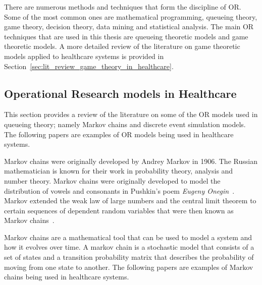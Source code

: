 There are numerous methods and techniques that form the discipline of OR.
Some of the most common ones are mathematical programming, queueing theory,
game theory, decision theory, data mining and statistical analysis.
The main OR techniques that are used in this thesis are queueing theoretic
models and game theoretic models.
A more detailed review of the literature on game theoretic models applied to
healthcare systems is provided in
Section~\ref{sec:lit_review_game_theory_in_healthcare}.


\subsection{Operational Research models in Healthcare}

This section provides a review of the literature on some of the OR models used
in queueing theory; namely Markov chains and discrete event simulation models.
The following papers are examples of OR models being used in healthcare
systems.

Markov chains were originally developed by Andrey Markov in 1906.
The Russian mathematician is known for their work in probability theory,
analysis and number theory.
Markov chains were originally developed to model the distribution of vowels and
consonants in Pushkin's poem \textit{Eugeny Onegin}~\cite{pushkin2003eugene}.
Markov extended the weak law of large numbers and the central limit theorem to
certain sequences of dependent random variables that were then known as
Markov chains~\cite{Markov_life_and_work}.

Markov chains are a mathematical tool that can be used to model a system and
how it evolves over time.
A markov chain is a stochastic model that consists of a set of states and a
transition probability matrix that describes the probability of moving from one
state to another.
The following papers are examples of Markov chains being used in healthcare
systems.

